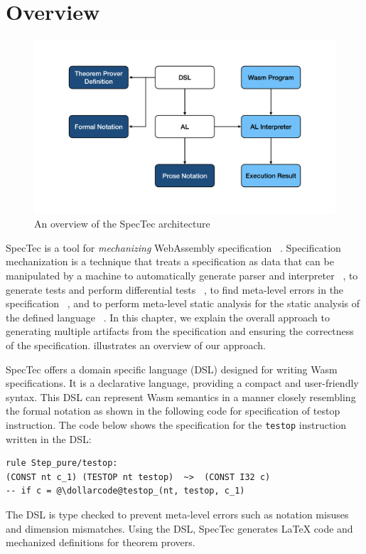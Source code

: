 
\chapter{Overview}
\label{ch:overview}
\noindent


\begin{figure}[t]
  \centerline{\includegraphics[width=15cm]{fig/overview}}
  \caption[An overview of the SpecTec architecture]
    {An overview of the SpecTec architecture}
    \label{fig:overview}
\end{figure}

SpecTec is a tool for \textit{mechanizing} WebAssembly specification
~\cite{spectec}.
Specification mechanization is a technique that treats a specification as data
that can be manipulated by a machine to automatically generate parser and
interpreter ~\cite{jiset}, to generate tests and perform differential tests
~\cite{jest}, to find meta-level errors in the specification ~\cite{jstar}, and
to perform meta-level static analysis for the static analysis of the defined
language ~\cite{jsaver}.
In this chapter, we explain the overall approach to generating multiple
artifacts from the specification and ensuring the correctness of the
specification.
 illustrates an overview of our approach.


SpecTec offers a domain specific language (DSL) designed for writing
Wasm specifications.
It is a declarative language, providing a compact and user-friendly syntax.
This DSL can represent Wasm semantics in a manner closely resembling the formal
notation as shown in the following code for specification of testop
instruction.
The code below shows the specification for the \texttt{testop} instruction
written in the DSL:
\begin{lstlisting}[style=dsl]
rule Step_pure/testop:
(CONST nt c_1) (TESTOP nt testop)  ~>  (CONST I32 c)
-- if c = @\dollarcode@testop_(nt, testop, c_1)
\end{lstlisting}
The DSL is type checked to prevent meta-level errors such as notation misuses and
dimension mismatches.
Using the DSL, SpecTec generates LaTeX code and mechanized definitions for theorem provers.


